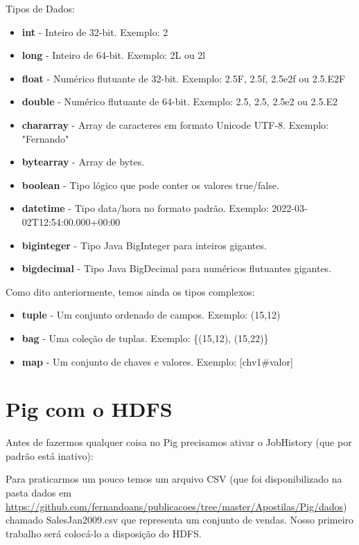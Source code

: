 \documentclass[a4paper,11pt]{article}
\begin{document}
Tipos de Dados: \vspace{-1em}
\begin{itemize}
	\item \textbf{int} - Inteiro de 32-bit. Exemplo: 2
	\item \textbf{long} - Inteiro de 64-bit. Exemplo: 2L ou 2l
	\item \textbf{float} - Numérico flutuante de 32-bit. Exemplo: 2.5F, 2.5f, 2.5e2f ou 2.5.E2F
	\item \textbf{double} - Numérico flutuante de 64-bit. Exemplo: 2.5, 2.5, 2.5e2 ou 2.5.E2
	\item \textbf{chararray} - Array de caracteres em formato Unicode UTF-8. Exemplo: "Fernando"
	\item \textbf{bytearray} - Array de bytes.
	\item \textbf{boolean} - Tipo lógico que pode conter os valores true/false.
	\item \textbf{datetime} - Tipo data/hora no formato padrão. Exemplo: 2022-03-02T12:54:00.000+00:00
	\item \textbf{biginteger} - Tipo Java BigInteger para inteiros gigantes.
	\item \textbf{bigdecimal} - Tipo Java BigDecimal para numéricos flutuantes gigantes.
\end{itemize}

Como dito anteriormente, temos ainda os tipos complexos: \vspace{-1em}
\begin{itemize}
	\item \textbf{tuple} - Um conjunto ordenado de campos. Exemplo: (15,12)
	\item \textbf{bag} - Uma coleção de tuplas. Exemplo: \{(15,12), (15,22)\}
	\item \textbf{map} - Um conjunto de chaves e valores. Exemplo: [chv1\#valor]
\end{itemize}

\section{Pig com o HDFS}
Antes de fazermos qualquer coisa no Pig precisamos ativar o JobHistory (que por padrão está inativo):

Para praticarmos um pouco temos um arquivo CSV (que foi disponibilizado na pasta dados em \url{https://github.com/fernandoans/publicacoes/tree/master/Apostilas/Pig/dados}) chamado SalesJan2009.csv que representa um conjunto de vendas. Nosso primeiro trabalho será colocá-lo a disposição do HDFS.
\end{document}
